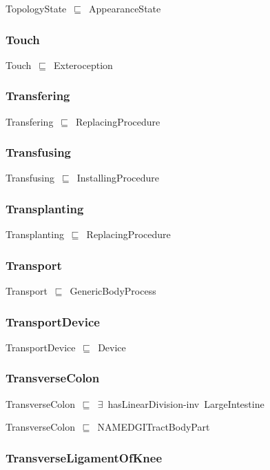\documentclass{article}
\begin{document}
TopologyState~\ensuremath{\sqsubseteq}~AppearanceState~

\subsubsection*{Touch}

Touch~\ensuremath{\sqsubseteq}~Exteroception~

\subsubsection*{Transfering}

Transfering~\ensuremath{\sqsubseteq}~ReplacingProcedure~

\subsubsection*{Transfusing}

Transfusing~\ensuremath{\sqsubseteq}~InstallingProcedure~

\subsubsection*{Transplanting}

Transplanting~\ensuremath{\sqsubseteq}~ReplacingProcedure~

\subsubsection*{Transport}

Transport~\ensuremath{\sqsubseteq}~GenericBodyProcess~

\subsubsection*{TransportDevice}

TransportDevice~\ensuremath{\sqsubseteq}~Device~

\subsubsection*{TransverseColon}

TransverseColon~\ensuremath{\sqsubseteq}~\ensuremath{\exists}~hasLinearDivision-inv~LargeIntestine~

TransverseColon~\ensuremath{\sqsubseteq}~NAMEDGITractBodyPart~

\subsubsection*{TransverseLigamentOfKnee}
\end{document}
